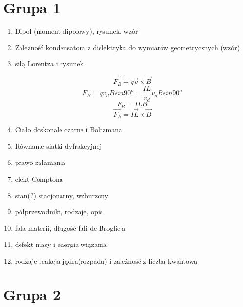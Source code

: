 \documentclass[12pt,a4paper]{article}
\begin{document}
\section{Grupa 1}
\begin {enumerate}


\item Dipol (moment dipolowy), rysunek, wzór

\item Zależność kondensatora z dielektryka do wymiarów geometrycznych (wzór)

\item siłą Lorentza i rysunek

 $$\vec{F_B}=q\vec{v}\times\vec{B}$$
 $$F_B = qv_dBsin90^o=\frac{IL}{v_d}v_dBsin90^o$$
 $$F_B=ILB$$
 $$\vec{F_B}=I\vec{L}\times\vec{B}$$

\item Ciało doskonale czarne i Boltzmana

\item Równanie siatki dyfrakcyjnej

\item prawo załamania

\item efekt Comptona

\item stan(?) stacjonarny, wzburzony

\item półprzewodniki, rodzaje, opis

\item fala materii, długość fali de Broglie'a

\item defekt masy i energia wiązania

\item rodzaje reakcja jądra(rozpadu) i zależność z liczbą kwantową

\end{enumerate}

\section{Grupa 2}
\end{document}

